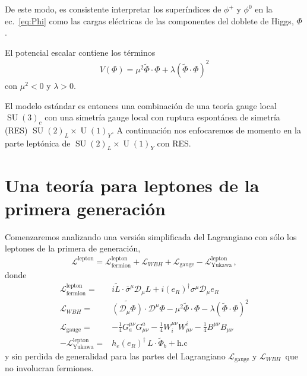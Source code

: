 \begin{frame}
De este modo, es consistente interpretar los superíndices de $\phi^+$ y $\phi^0$ en la ec.~\eqref{eq:Phi} como las cargas eléctricas de las componentes del doblete de Higgs, $\Phi$.

\end{frame}

El potencial escalar contiene los términos
\begin{align}
  V(\Phi)=\mu^2\widetilde{\Phi}\cdot\Phi+\lambda \left( \widetilde{\Phi}\cdot\Phi \right)^2 
\end{align}
con $\mu^2<0$ y $\lambda>0$. %


El modelo estándar es entonces una combinación de una teoría gauge local $\operatorname{SU}(3)_{c}$ con una simetría gauge local con ruptura espontánea de simetría (RES) $\operatorname{SU}(2)_L\times \operatorname{U}(1)_Y$. A continuación nos enfocaremos de momento en la parte leptónica de  $\operatorname{SU}(2)_L\times \operatorname{U}(1)_Y$ con RES.

\section{Una teoría para leptones de la primera generación}
Comenzaremos analizando una versión simplificada del Lagrangiano con sólo los leptones de la primera de generación,
\begin{align}
  \mathcal{L}^{\text{lepton}}=\mathcal{L}_{\text{fermion}}^{\text{lepton}}+
   \mathcal{L}_{WBH}+\mathcal{L}_{\text{gauge}}-\mathcal{L}_{\text{Yukawa}}^{\text{lepton}}\,,
\end{align}
donde
\begin{align}
  \label{eq:smscalarlep}
\mathcal{L}_{\text{fermion}}^{\text{lepton}}=&i\widetilde{L}\cdot \overline{\sigma}^\mu\mathcal{D}_\mu L 
+i(e_R)^{\dagger}\sigma^\mu\mathcal{D}_\mu {e_R}\nonumber\\
  \mathcal{L}_{WBH}=&\widetilde{\left( \mathcal{D}_\mu{\Phi} \right)}\cdot\mathcal{D}^\mu\Phi-\mu^2\widetilde{\Phi}\cdot\Phi-\lambda \left( \widetilde{\Phi}\cdot\Phi \right)^2 \nonumber\\
\mathcal{L}_{\text{gauge}}=& -\tfrac{1}{4}G^{\mu\nu}_a G_{\mu\nu}^a-\tfrac{1}{4}W^{\mu\nu}_i W_{\mu\nu}^i-\tfrac{1}{4}B^{\mu\nu} B_{\mu\nu}\nonumber\\
-\mathcal{L}_{\text{Yukawa}}^{\text{lepton}}=&  h_e \left( e_R \right)^{\dagger}\,L\cdot \widetilde{\Phi}_b +\text{h.c}
\end{align}
y sin perdida de generalidad para las partes del Lagrangiano $\mathcal{L}_{\text{gauge}}$ y $ \mathcal{L}_{WBH}\,$ que no involucran fermiones.

